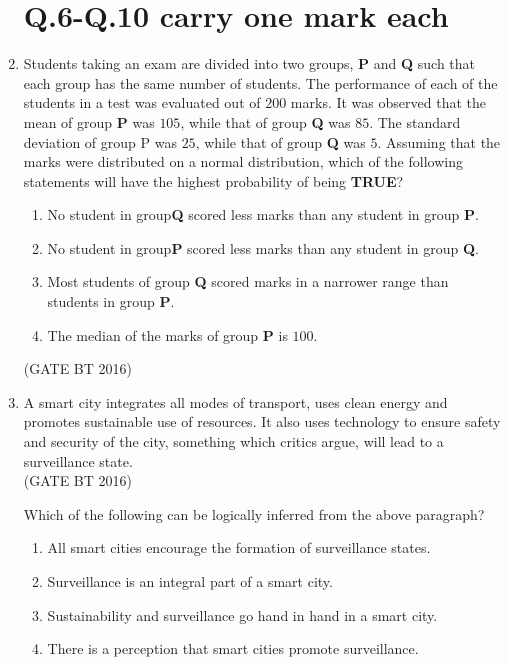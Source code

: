\documentclass[journal,12pt,onecolumn]{IEEEtran}
\theoremstyle{remark}
\begin{document}
\begin{enumerate}
 \section{Q.6-Q.10 carry one mark each}
\item Students taking an exam are divided into two groups,\textbf{ P} and \textbf{Q} such that each group has the same number of students. The performance of each of the students in a test was evaluated out of $200$ marks. It was observed that the mean of group \textbf{P} was $105$, while that of group \textbf{Q} was $85$. The standard deviation of group P was $25$, while that of group \textbf{Q} was $5$. Assuming that the marks were distributed on a normal distribution, which of the following statements will have the highest probability of being \textbf{TRUE}?
 \begin{multicols}{2}
 \begin{enumerate}
 \item No student in group\textbf{Q} scored less marks than any student in group \textbf{P}.
\item No student in group\textbf{P} scored less marks than any student in group \textbf{Q}.
\item  Most students of group \textbf{Q} scored marks in a narrower range than students in group \textbf{P}.
\item  The median of the marks of group \textbf{P} is $100$.
 \end{enumerate}
 \end{multicols} \hfill(GATE BT 2016)   
 
\item A smart city integrates all modes of transport, uses clean energy and promotes sustainable use of resources. It also uses technology to ensure safety and security of the city, something which critics argue, will lead to a surveillance state.\\ \hfill(GATE BT 2016) 

 Which of the following can be logically inferred from the above paragraph?
\begin{enumerate}[label=\roman*.]
\item All smart cities encourage the formation of surveillance states.
\item Surveillance is an integral part of a smart city.
\item Sustainability and surveillance go hand in hand in a smart city.
\item  There is a perception that smart cities promote surveillance.
\end{enumerate}
         

\end{enumerate}
\end{document}
